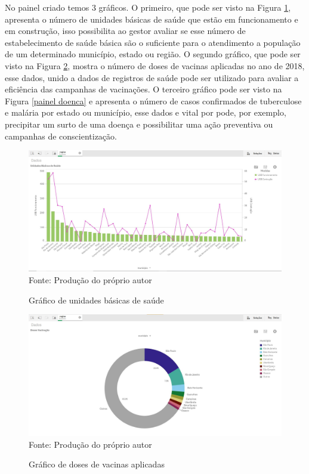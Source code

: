 \documentclass[
	12pt,				%
	openright,			%
	oneside,			%
	a4paper,			%
	chapter=TITLE,		%
	section=TITLE,		%
	subsection=TITLE,	%
	subsubsection=TITLE,%
	english,			%
	brazil				%
	]{abntex2}
\theoremstyle{definition}
\begin{document}
    No painel criado temos 3 gráficos. O primeiro, que pode ser visto na Figura \ref{painel usb}, apresenta o número de unidades básicas de saúde que estão em funcionamento e em construção, isso possibilita ao gestor avaliar se esse número de estabelecimento de saúde básica são o suficiente para o atendimento a população de um determinado município, estado ou região. O segundo gráfico, que pode ser visto na Figura \ref{painel vacina}, mostra o número de doses de vacinas aplicadas no ano de 2018, esse dados, unido a dados de registros de saúde pode ser utilizado para avaliar a eficiência das campanhas de vacinações. O terceiro gráfico pode ser visto na Figura \ref{painel doenca} e apresenta o número de casos confirmados de tuberculose e malária por estado ou município, esse dados e vital por pode, por exemplo, precipitar um surto de uma doença e possibilitar uma ação preventiva ou campanhas de conscientização.  
    
    \begin{figure}[H]
         \centering
         \caption{Gráfico de unidades básicas de saúde}
         \includegraphics[scale=0.4]{imagens/painel-usb.JPG}
         \\{\footnotesize Fonte: Produção do próprio autor}
         \label{painel usb}
    \end{figure}
    
    \begin{figure}[H]
         \centering
         \caption{Gráfico de doses de vacinas aplicadas}
         \includegraphics[scale=0.4]{imagens/painel-vacinacao.JPG}
         \\{\footnotesize Fonte: Produção do próprio autor}
         \label{painel vacina}
    \end{figure}
    
\end{document}
